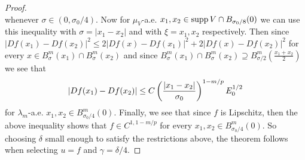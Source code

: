 \begin{proof}
\[\]
whenever $\sigma \in (0, \sigma_0/4)$. Now for $\mu_V$-a.e. $x_1,x_2 \in \operatorname{supp} V \cap B_{\sigma_0/8}(0)$ we can use this inequality with $\sigma = |x_1 - x_2|$ and with $\xi = x_1,x_2$ respectively. Then since $|Df(x_1) - Df(x_2)|^2 \le 2|Df(x) - Df(x_1)|^2 + 2|Df(x) - Df(x_2)|^2$ for every $x \in B^m_{\sigma}(x_1) \cap B^m_{\sigma}(x_2)$ and since $B^m_{\sigma}(x_1) \cap B^m_{\sigma}(x_2) \supseteq B^m_{\sigma/2}(\frac{x_1+x_2}{2})$ we see that
\[
    |Df(x_1) - Df(x_2)| \le C\left(\frac{|x_1 - x_2|}{\sigma_0}\right)^{1-m/p}E_0^{1/2}
\]
for $\lambda_m$-a.e. $x_1,x_2 \in B^m_{\sigma_0/4}(0)$. Finally, we see that since $f$ is Lipschitz, then the above inequality shows that $f \in C^{1,1-m/p}$ for every $x_1,x_2 \in B^m_{\sigma_0/4}(0)$. So choosing $\delta$ small enough to satisfy the restrictions above, the theorem follows when selecting $u=f$ and $\gamma = \delta/4$.
\end{proof}

